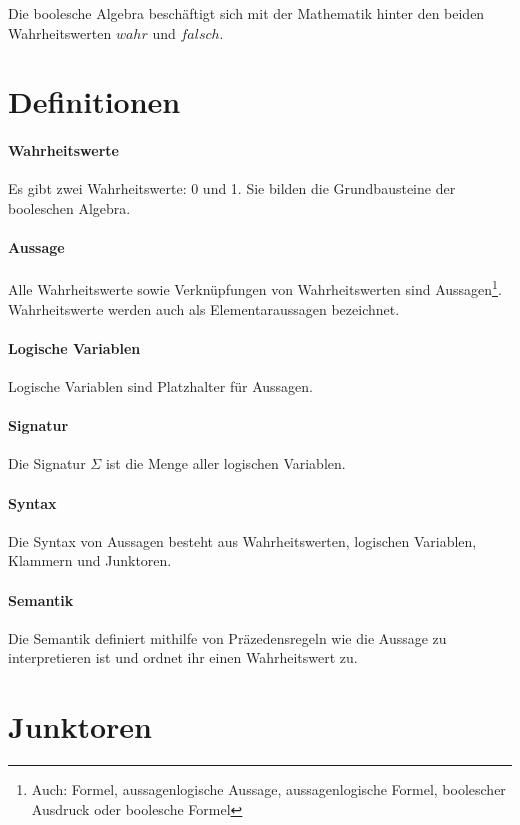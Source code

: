 \documentclass[../main.tex]{subfiles}
\begin{document}
    Die boolesche Algebra beschäftigt sich mit der Mathematik hinter den beiden Wahrheitswerten $wahr$ und $falsch$.
    \clearpage

    \section{Definitionen}
            \paragraph{Wahrheitswerte}
                Es gibt zwei Wahrheitswerte: 0 und 1. Sie bilden die Grundbausteine der booleschen Algebra.
                
            \paragraph{Aussage}
                Alle Wahrheitswerte sowie Verknüpfungen von Wahrheitswerten sind Aussagen\footnote{Auch: Formel, aussagenlogische Aussage, aussagenlogische Formel, boolescher Ausdruck oder boolesche Formel}. Wahrheitswerte werden auch als Elementaraussagen bezeichnet.
                
            \paragraph{Logische Variablen}
                Logische Variablen sind Platzhalter für Aussagen.
                
            \paragraph{Signatur}
                Die Signatur $\Sigma$ ist die Menge aller logischen Variablen.
                
            \paragraph{Syntax}
                Die Syntax von Aussagen besteht aus Wahrheitswerten, logischen Variablen, Klammern und Junktoren.
            \paragraph{Semantik}
                Die Semantik definiert mithilfe von Präzedensregeln wie die Aussage zu interpretieren ist und ordnet ihr einen Wahrheitswert zu.
                
    \section{Junktoren}
        \label{section:DiskreteMathematik:BoolscheAlgebra:Junktoren}
\end{document}
